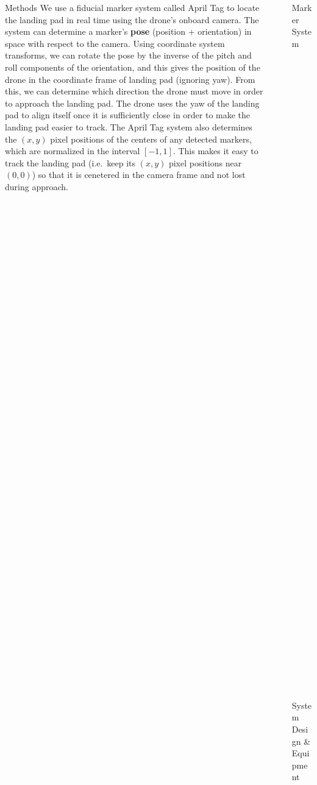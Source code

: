 \documentclass[final, 20pt]{beamer}
\newlength{\sepwidth}
\newlength{\colwidth}
\newcommand{\separatorcolumn}{\begin{column}{\sepwidth}\end{column}}
\begin{document}
\begin{frame}[t]
\begin{columns}[t]
\begin{column}{\colwidth}
\begin{block}{Methods}
    We use a fiducial marker system called April Tag to locate the landing pad in real time using the drone's onboard camera.
    The system can determine a marker's \textbf{pose} (position + orientation) in space with respect to the camera.
    Using coordinate system transforms, we can rotate the pose by the inverse of the pitch and roll components of the orientation,
    and this gives the position of the drone in the coordinate frame of landing pad (ignoring yaw).
    From this, we can determine which direction the drone must move in order to approach the landing pad.
    The drone uses the yaw of the landing pad to align itself once it is sufficiently close in order to make the landing pad easier to track.
    The April Tag system also determines the $(x,y)$ pixel positions of the centers of any detected markers,
    which are normalized in the interval $[-1,1]$.
    This makes it easy to track the landing pad (i.e.~keep its $(x,y)$ pixel positions near $(0,0)$)
    so that it is cenetered in the camera frame and not lost during approach.

  \end{block}

\end{column}

\separatorcolumn

\begin{column}{\colwidth}

  \begin{block}{Marker System}

    \begin{figure}
      \centering
      \includegraphics[width=5cm]{images/tagCustom24h10_00002_00001_00000}
      \caption{The landing pad with 3 embedded April Tags of the 24h10 family.}
    \end{figure}

  \end{block}

  \begin{alertblock}{System Design \& Equipment}


\end{alertblock}
\end{column}
\end{columns}
\end{frame}
\end{document}
